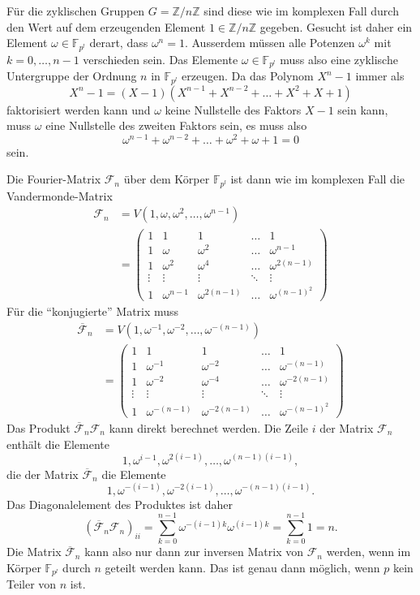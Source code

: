 Für die zyklischen Gruppen $G=\mathbb{Z}/n\mathbb{Z}$ sind diese wie
im komplexen Fall durch den Wert auf dem erzeugenden Element
$1\in\mathbb{Z}/n\mathbb{Z}$ gegeben.
Gesucht ist daher ein Element $\omega\in\mathbb{F}_{p^l}$ derart,
dass $\omega^n=1$.
Ausserdem müssen alle Potenzen $\omega^k$ mit $k=0,\dots,n-1$
verschieden sein.
Das Elemente $\omega\in\mathbb{F}_{p^l}$ muss also eine
zyklische Untergruppe der Ordnung $n$ in $\mathbb{F}_{p^l}$ 
erzeugen.
Da das Polynom $X^n-1$ immer als
\[
X^n-1
=
(X-1)(X^{n-1}+X^{n-2}+\dots+X^2+X+1)
\]
faktorisiert werden kann und $\omega$ keine Nullstelle des Faktors
$X-1$ sein kann, muss $\omega$ eine Nullstelle des zweiten Faktors sein,
es muss also
\begin{equation}
\omega^{n-1}+\omega^{n-2}+\dots+\omega^2 + \omega + 1 = 0
\label{buch:diskret:koerper:eqn:summeomega}
\end{equation}
sein.

Die Fourier-Matrix $\mathscr{F}_n$ über dem Körper $\mathbb{F}_{p^l}$
ist dann wie im komplexen Fall die Vandermonde-Matrix
\begin{align*}
\mathscr{F}_n
&=
V(1,\omega,\omega^2,\dots,\omega^{n-1})
\\
&=
\begin{pmatrix}
1&1&1&\dots&1\\
1&\omega&\omega^2&\dots&\omega^{n-1}\\
1&\omega^2&\omega^4&\dots&\omega^{2(n-1)}\\
\vdots&\vdots&\vdots&\ddots&\vdots\\
1&\omega^{n-1}&\omega^{2(n-1)}&\dots&\omega^{(n-1)^2}
\end{pmatrix}
\end{align*}
Für die ``konjugierte'' Matrix muss
\begin{align*}
\overline{\mathscr{F}}_n
&=
V(1,\omega^{-1},\omega^{-2},\dots,\omega^{-(n-1)})
\\
&=
\begin{pmatrix}
1&1&1&\dots&1\\
1&\omega^{-1}&\omega^{-2}&\dots&\omega^{-(n-1)}\\
1&\omega^{-2}&\omega^{-4}&\dots&\omega^{-2(n-1)}\\
\vdots&\vdots&\vdots&\ddots&\vdots\\
1&\omega^{-(n-1)}&\omega^{-2(n-1)}&\dots&\omega^{-(n-1)^2}
\end{pmatrix}
\end{align*}
Das Produkt $\overline{\mathscr{F}}_n\mathscr{F}_n$ kann direkt
berechnet werden.
Die Zeile $i$ der Matrix $\mathscr{F}_n$ enthält die Elemente 
\[
1,\omega^{i-1},\omega^{2(i-1)},\dots,\omega^{(n-1)(i-1)},
\]
die der Matrix $\overline{\mathscr{F}}_n$ die Elemente
\[
1,\omega^{-(i-1)},\omega^{-2(i-1)},\dots,\omega^{-(n-1)(i-1)}.
\]
Das Diagonalelement des Produktes ist daher
\[
(\overline{\mathscr{F}}_n
\mathscr{F}_n)_{ii}
=
\sum_{k=0}^{n-1}
\omega^{-(i-1)k}\omega^{(i-1)k}
=
\sum_{k=0}^{n-1} 1
=
n.
\]
Die Matrix $\overline{\mathscr{F}}_n$ kann also nur dann zur
inversen Matrix von $\mathscr{F}_n$ werden, wenn im Körper
$\mathbb{F}_{p^l}$ durch $n$ geteilt werden kann.
Das ist genau dann möglich, wenn $p$ kein Teiler von $n$ ist.

